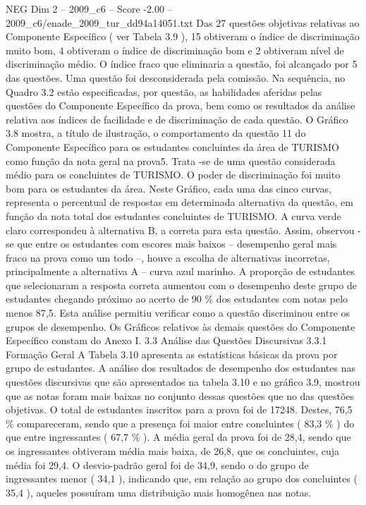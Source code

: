 \begin{textsample}{NEG Dim 2 – 2009\_c6 – Score -2.00 – 2009\_c6/enade\_2009\_tur\_dd94a14051.txt}
Das 27 questões objetivas relativas ao Componente Específico ( ver Tabela 3.9 ), 15 obtiveram o índice de discriminação muito bom, 4 obtiveram o índice de discriminação bom e 2 obtiveram nível de discriminação médio.
O índice fraco que eliminaria a questão, foi alcançado por 5 das questões.
Uma questão foi desconsiderada pela comissão.
Na sequência, no Quadro 3.2 estão especificadas, por questão, as habilidades aferidas pelas questões do Componente Específico da prova, bem como os resultados da análise relativa aos índices de facilidade e de discriminação de cada questão.
O Gráfico 3.8 mostra, a título de ilustração, o comportamento da questão 11 do Componente Específico para os estudantes concluintes da área de TURISMO como função da nota geral na prova5.
Trata -se de uma questão considerada médio para os concluintes de TURISMO.
O poder de discriminação foi muito bom para os estudantes da área.
Neste Gráfico, cada uma das cinco curvas, representa o percentual de respostas em determinada alternativa da questão, em função da nota total dos estudantes concluintes de TURISMO.
A curva verde claro correspondeu à alternativa B, a correta para esta questão.
Assim, observou -se que entre os estudantes com escores mais baixos – desempenho geral mais fraco na prova como um todo –, houve a escolha de alternativas incorretas, principalmente a alternativa A – curva azul marinho.
A proporção de estudantes que selecionaram a resposta correta aumentou com o desempenho deste grupo de estudantes chegando próximo ao acerto de 90 \% dos estudantes com notas pelo menos 87,5.
Esta análise permitiu verificar como a questão discriminou entre os grupos de desempenho.
Os Gráficos relativos às demais questões do Componente Específico constam do Anexo I. 3.3 Análise das Questões Discursivas 3.3.1 Formação Geral A Tabela 3.10 apresenta as estatísticas básicas da prova por grupo de estudantes.
A análise dos resultados de desempenho dos estudantes nas questões discursivas que são apresentados na tabela 3.10 e no gráfico 3.9, mostrou que as notas foram mais baixas no conjunto dessas questões que no das questões objetivas.
O total de estudantes inscritos para a prova foi de 17248.
Destes, 76,5 \% compareceram, sendo que a presença foi maior entre concluintes ( 83,3 \% ) do que entre ingressantes ( 67,7 \% ).
A média geral da prova foi de 28,4, sendo que os ingressantes obtiveram média mais baixa, de 26,8, que os concluintes, cuja média foi 29,4.
O desvio-padrão geral foi de 34,9, sendo o do grupo de ingressantes menor ( 34,1 ), indicando que, em relação ao grupo dos concluintes ( 35,4 ), aqueles possuíram uma distribuição mais homogênea nas notas.

\end{textsample}
